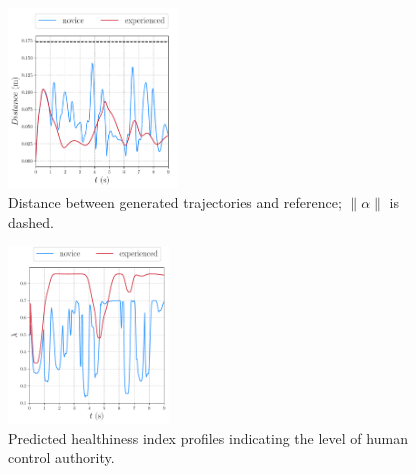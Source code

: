 \begin{figure}[h]
	\centering
	\includegraphics[width=0.4\textwidth]{figures/comparison}
	\vspace{-0.3cm}
	\caption{Distance between generated trajectories and reference; $\|\alpha\|$ is dashed.}\label{fig:boundary}%
\end{figure}
\begin{figure}[h]
	\centering
	\includegraphics[width=0.38\textwidth]{figures/ph_index}
	\vspace{-0.3cm}
	\caption{Predicted healthiness index profiles indicating the level of human control authority.}\label{fig:ph_evo}%
\end{figure}
